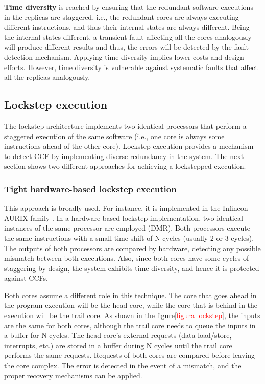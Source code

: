 \textbf{Time diversity} is reached by ensuring that the redundant software executions in the replicas are staggered, i.e., the redundant cores are always executing different instructions, and thus their internal states are always different. Being the internal states different, a transient fault affecting all the cores analogously will produce different results and thus, the errors will be detected by the fault-detection mechanism. Applying time diversity implies lower costs and design efforts. However, time diversity is vulnerable against systematic faults that affect all the replicas analogously. %


\bigskip


\subsection{Lockstep execution}

The lockstep architecture implements two identical processors that perform a staggered execution of the same software (i.e., one core is always some instructions ahead of the other core). Lockstep execution provides a mechanism to detect CCF by implementing diverse redundancy in the system. The next section shows two different approaches for achieving a lockstepped execution.

\subsubsection{Tight hardware-based lockstep execution}

This approach is broadly used. For instance, it is implemented in the Infineon AURIX family \cite{infineon2012aurix}. In a hardware-based lockstep implementation, two identical instances of the same processor are employed (DMR). Both processors execute the same instructions with a small-time shift of N cycles (usually 2 or 3 cycles). The outputs of both processors are compared by hardware, detecting any possible mismatch between both executions. Also, since both cores have some cycles of staggering by design, the system exhibits time diversity, and hence it is protected against CCFs. 

Both cores assume a different role in this technique. The core that goes ahead in the program execution will be the head core, while the core that is behind in the execution will be the trail core. As shown in the figure[\textcolor{red}{figura lockstep}], the inputs are the same for both cores, although the trail core needs to queue the inputs in a buffer for N cycles. The head core's external requests (data load/store, interrupts, etc.) are stored in a buffer during N cycles until the trail core performs the same requests. Requests of both cores are compared before leaving the core complex. The error is detected in the event of a mismatch, and the proper recovery mechanisms can be applied.

